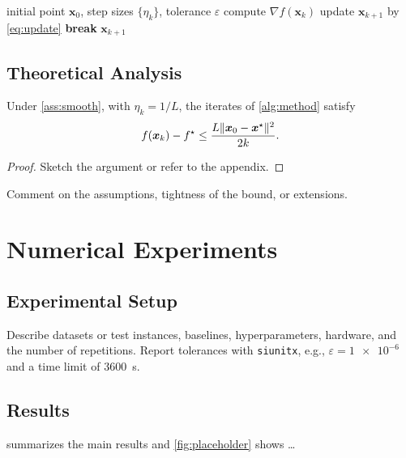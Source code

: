 \begin{algorithm}[t]
  \caption{Proposed method}\label{alg:method}
  \begin{algorithmic}[1]
    \Require initial point $\bm{x}_0$, step sizes $\{\eta_k\}$, tolerance $\varepsilon$
      \State compute $\nabla f(\bm{x}_k)$
      \State update $\bm{x}_{k+1}$ by \eqref{eq:update}
       \State \textbf{break} \EndIf
    \EndFor
    \Ensure $\bm{x}_{k+1}$
  \end{algorithmic}
\end{algorithm}

\subsection{Theoretical Analysis}\label{sec:theory}
\begin{theorem}\label{thm:main}
Under \cref{ass:smooth}, with $\eta_k = 1/L$, the iterates of \cref{alg:method} satisfy
\[
  f(\bm{x}_k) - f^\star \le \frac{L\lVert\bm{x}_0-\bm{x}^\star\rVert^2}{2k}.
\]
\end{theorem}
\begin{proof}
Sketch the argument or refer to the appendix.
\end{proof}

\begin{remark}
Comment on the assumptions, tightness of the bound, or extensions.
\end{remark}

\section{Numerical Experiments}\label{sec:results}
\subsection{Experimental Setup}\label{sec:setup}
Describe datasets or test instances, baselines, hyperparameters, hardware, and the number of repetitions. Report tolerances with \texttt{siunitx}, e.g., $\varepsilon=\num{1e-6}$ and a time limit of \SI{3600}{\second}.

\subsection{Results}\label{sec:main-results}
 summarizes the main results and \cref{fig:placeholder} shows \ldots

